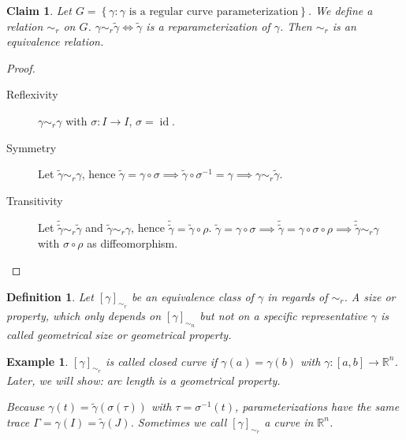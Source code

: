 \documentclass{article}
\newtheorem{example}{Example}  \numberwithin{example}{section}
\newtheorem{definition}{Definition}  \numberwithin{definition}{section}
\newtheorem*{claim}{Claim}%
\newcommand{\set}[1]{\left\{#1\right\}}
\begin{document}
\begin{claim}
  Let $G = \set{\gamma: \gamma \text{ is a regular curve parameterization}}$.
  We define a relation $\sim_{r}$ on $G$. $\gamma \sim_r \tilde\gamma \iff \tilde\gamma$ is a reparameterization of $\gamma$.
  Then $\sim_r$ is an equivalence relation.
\end{claim}
\begin{proof}
  \begin{description}
    \item[Reflexivity]
      $\gamma \sim_r \gamma$ with $\sigma: I \to I$, $\sigma = \operatorname{id}$. 
    \item[Symmetry]
      Let $\tilde\gamma \sim_r \gamma$, hence $\tilde\gamma = \gamma \circ \sigma \implies \tilde\gamma \circ \sigma^{-1} = \gamma \implies \gamma \sim_r \tilde\gamma$.
    \item[Transitivity]
      Let $\tilde{\tilde\gamma} \sim_r \tilde\gamma$ and $\tilde\gamma \sim_r \gamma$, hence $\tilde{\tilde\gamma} = \tilde\gamma \circ \rho$.
      $\tilde\gamma = \gamma \circ \sigma \implies \tilde{\tilde\gamma} = \gamma \circ \sigma \circ \rho \implies \tilde{\tilde\gamma} \sim_r \gamma$ with $\sigma \circ \rho$ as diffeomorphism.
  \end{description}
\end{proof}

\begin{definition}
  Let $[\gamma]_{\sim_r}$ be an equivalence class of $\gamma$ in regards of $\sim_r$. A size or property, which only depends on $[\gamma]_{\sim_n}$ but not on a specific representative $\gamma$ is called \emph{geometrical size} or \emph{geometrical property}.
\end{definition}

\begin{example}
  $[\gamma]_{\sim_r}$ is called \emph{closed curve} if $\gamma(a) = \gamma(b)$ with $\gamma: [a,b] \to \mathbb R^n$.
  Later, we will show: arc length is a geometrical property.

  Because $\gamma(t) = \tilde{\gamma}(\sigma(\tau))$ with $\tau = \sigma^{-1}(t)$, parameterizations have the same trace $\Gamma = \gamma(I) = \tilde\gamma(J)$. Sometimes we call $[\gamma]_{\sim_r}$ a curve in $\mathbb R^n$.
\end{example}
\end{document}
